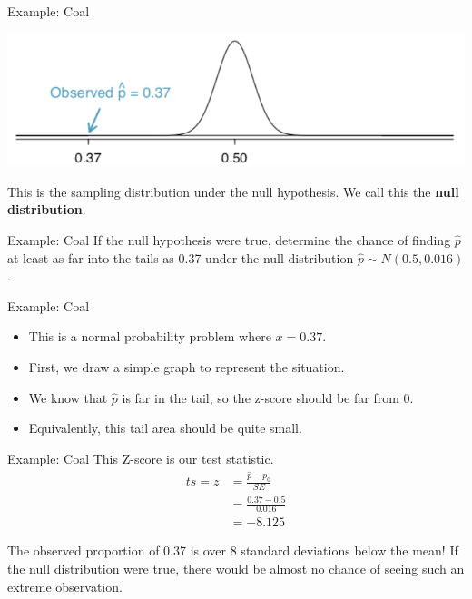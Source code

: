 \begin{frame}{Example: Coal}
    \begin{center}
        \includegraphics[scale=0.5]{images/nulldist.png}
    \end{center}
    This is the sampling distribution under the null hypothesis. We call this the \textbf{null distribution}. 
\end{frame}

\begin{frame}{Example: Coal}
    If the null hypothesis were true, determine the chance of finding $\hat{p}$ at least as far into the tails as 0.37 under the null distribution $\hat{p} \sim N(0.5, 0.016)$.
\end{frame}

\begin{frame}{Example: Coal}
    \begin{itemize}
        \item This is a normal probability problem where $x = 0.37$.
        \item First, we draw a simple graph to represent the situation.
        \item We know that $\hat{p}$ is far in the tail, so the z-score should be far from 0.
        \item Equivalently, this tail area should be quite small. 
    \end{itemize}
\end{frame}

\begin{frame}{Example: Coal}
    This Z-score is our test statistic.
    \begin{align*}
        ts = z &= \frac{\hat{p}-p_0}{SE} \\
        &= \frac{0.37 - 0.5}{0.016} \\
        &= −8.125 
    \end{align*}
    
    \vspace{12pt}The observed proportion of 0.37 is over 8 standard deviations below the mean! If the null distribution were true, there would be almost no chance of seeing such an extreme observation.
\end{frame}

